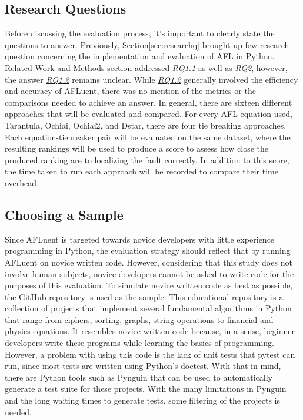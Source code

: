 \subsection{Research Questions}
\label{subsec:research_questions_eval}

Before discussing the evaluation process, it's important to clearly state the
questions to answer. Previously, Section\ref{sec:researchq} brought up few
research question concerning the implementation and evaluation of AFL in Python.
Related Work and Methods section addressed \hyperref[para:RQ1.1]{\emph{RQ1.1}} as well as
\hyperref[para:RQ2]{\emph{RQ2}}, however, the answer \hyperref[para:RQ1.2]{\emph{RQ1.2}} remains unclear. While \hyperref[para:RQ1.2]{\emph{RQ1.2}}
generally involved the efficiency and accuracy of AFLuent, there was no mention
of the metrics or the comparisons needed to achieve an answer. In general, there
are sixteen different approaches that will be evaluated and compared. For every AFL
equation used, Tarantula, Ochiai, Ochiai2, and Dstar, there are four tie breaking
approaches. Each equation-tiebreaker pair will be evaluated on the same dataset,
where the resulting rankings will be used to produce a score to assess how
close the produced ranking are to localizing the fault correctly. In addition to
this score, the time taken to run each approach will be recorded to compare
their time overhead.

\subsection{Choosing a Sample}
\label{subsec:choosing_sample}

Since AFLuent is targeted towards novice developers with little experience
programming in Python, the evaluation strategy should reflect that by running
AFLuent on novice written code. However, considering that this study does not
involve human subjects, novice developers cannot be asked to write code for the
purposes of this evaluation. To simulate novice written code as best as
possible, the GitHub repository \cite{the_algorithms_python}
is used as the sample. This educational repository is a collection of projects
that implement several fundamental algorithms in Python that range from ciphers,
sorting, graphs, string operations to financial and physics equations.
It resembles novice written
code because, in a sense, beginner developers write these programs while
learning the basics of programming. However, a problem
with using this code is the lack of unit tests that pytest can run, since most
tests are written using Python's doctest. With that in mind, there are Python
tools such as Pynguin\cite{Lukasczyk_Pynguin_Automated_Unit_2022}
that can be used to automatically generate a test suite for these projects.
With the many limitations in Pynguin and the long waiting times to generate
tests, some filtering of the projects is needed.


